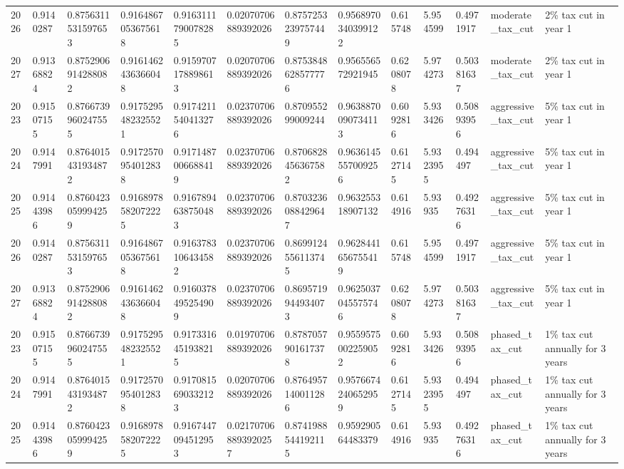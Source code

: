 \begin{sidewaystable}[H]
\begin{tabular}{|l|l|l|l|l|l|l|l|l|l|l|l|l|}
2026 & 0.9140287 & 0.8756311531597653 & 0.9164867053675618 & 0.9163111790078285 & 0.02070706889392026 & 0.8757253239757449 & 0.9568970340399122 & 0.615748 & 5.954599 & 0.4971917 & moderate\_tax\_cut & 2\% tax cut in year 1 \\
2027 & 0.91368824 & 0.8752906914288082 & 0.9161462436366048 & 0.9159707178898613 & 0.02070706889392026 & 0.8753848628577776 & 0.956556572921945 & 0.6208078 & 5.974273 & 0.50381637 & moderate\_tax\_cut & 2\% tax cut in year 1 \\
\hline
2023 & 0.91507155 & 0.8766739960247555 & 0.9175295482325521 & 0.9174211540413276 & 0.02370706889392026 & 0.870955299009244 & 0.9638870090734113 & 0.6092816 & 5.933426 & 0.50893956 & aggressive\_tax\_cut & 5\% tax cut in year 1 \\
2024 & 0.9147991 & 0.8764015431934872 & 0.9172570954012838 & 0.9171487006688419 & 0.02370706889392026 & 0.8706828456367582 & 0.9636145557009256 & 0.6127145 & 5.9323955 & 0.494497 & aggressive\_tax\_cut & 5\% tax cut in year 1 \\
2025 & 0.91443986 & 0.8760423059994259 & 0.9168978582072225 & 0.9167894638750483 & 0.02370706889392026 & 0.8703236088429647 & 0.963255318907132 & 0.614916 & 5.93935 & 0.49276316 & aggressive\_tax\_cut & 5\% tax cut in year 1 \\
2026 & 0.9140287 & 0.8756311531597653 & 0.9164867053675618 & 0.9163783106434582 & 0.02370706889392026 & 0.8699124556113745 & 0.9628441656755419 & 0.615748 & 5.954599 & 0.4971917 & aggressive\_tax\_cut & 5\% tax cut in year 1 \\
2027 & 0.91368824 & 0.8752906914288082 & 0.9161462436366048 & 0.9160378495254909 & 0.02370706889392026 & 0.8695719944934073 & 0.9625037045575746 & 0.6208078 & 5.974273 & 0.50381637 & aggressive\_tax\_cut & 5\% tax cut in year 1 \\
\hline
2023 & 0.91507155 & 0.8766739960247555 & 0.9175295482325521 & 0.9173316451938215 & 0.01970706889392026 & 0.8787057901617378 & 0.9559575002259052 & 0.6092816 & 5.933426 & 0.50893956 & phased\_tax\_cut & 1\% tax cut annually for 3 years \\
2024 & 0.9147991 & 0.8764015431934872 & 0.9172570954012838 & 0.9170815690332123 & 0.02070706889392026 & 0.8764957140011286 & 0.9576674240652959 & 0.6127145 & 5.9323955 & 0.494497 & phased\_tax\_cut & 1\% tax cut annually for 3 years \\
2025 & 0.91443986 & 0.8760423059994259 & 0.9168978582072225 & 0.9167447094512953 & 0.021707068893920257 & 0.8741988544192115 & 0.959290564483379 & 0.614916 & 5.93935 & 0.49276316 & phased\_tax\_cut & 1\% tax cut annually for 3 years \\

\end{tabular}
\end{sidewaystable}
